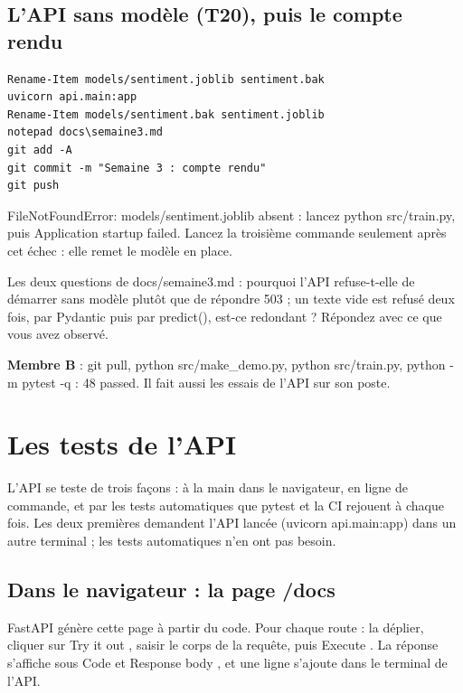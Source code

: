 \documentclass[11pt,a4paper]{article}
\newcommand{\co}[1]{{\ttfamily\hyphenchar\font=45\relax #1}}
\begin{document}
\subsection{L'API sans modèle (T20), puis le compte rendu}

\begin{lstlisting}
Rename-Item models/sentiment.joblib sentiment.bak
uvicorn api.main:app
Rename-Item models/sentiment.bak sentiment.joblib
notepad docs\semaine3.md
git add -A
git commit -m "Semaine 3 : compte rendu"
git push
\end{lstlisting}

\begin{attendu}
\co{FileNotFoundError: models/sentiment.joblib absent : lancez python src/train.py}, puis
\co{Application startup failed}. Lancez la troisième commande seulement après cet échec : elle remet le
modèle en place.
\end{attendu}

Les deux questions de \co{docs/semaine3.md} : pourquoi l'API refuse-t-elle de démarrer sans modèle plutôt
que de répondre 503 ; un texte vide est refusé deux fois, par Pydantic puis par \co{predict()}, est-ce
redondant ? Répondez avec ce que vous avez observé.

\textbf{Membre B} : \co{git pull}, \co{python src/make\_demo.py}, \co{python src/train.py},
\co{python -m pytest -q} : 48 passed. Il fait aussi les essais de l'API sur son poste.

\section{Les tests de l'API}
\label{sec:tests-api}

L'API se teste de trois façons : à la main dans le navigateur, en ligne de commande, et par les tests
automatiques que pytest et la CI rejouent à chaque fois. Les deux premières demandent l'API lancée
(\co{uvicorn api.main:app}) dans un autre terminal ; les tests automatiques n'en ont pas besoin.

\subsection{Dans le navigateur : la page \co{/docs}}

FastAPI génère cette page à partir du code. Pour chaque route : la déplier, cliquer sur
\og Try it out \fg{}, saisir le corps de la requête, puis \og Execute \fg{}. La réponse s'affiche sous
\og Code \fg{} et \og Response body \fg{}, et une ligne s'ajoute dans le terminal de l'API.
\end{document}

